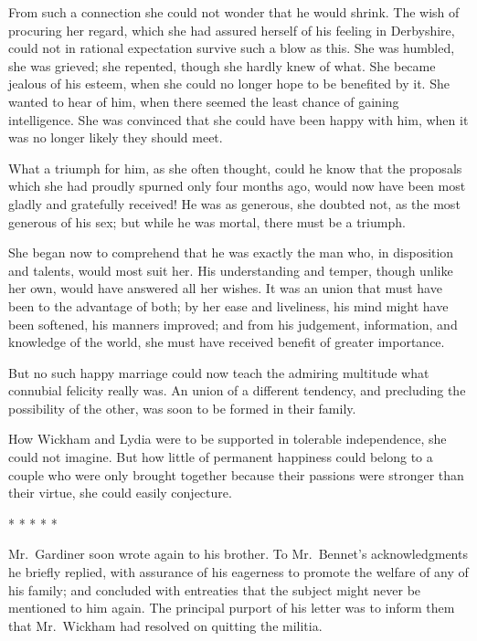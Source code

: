 From such a connection she could not wonder that he would shrink.
The wish of procuring her regard, which she had assured herself
of his feeling in Derbyshire, could not in rational expectation
survive such a blow as this.  She was humbled, she was grieved;
she repented, though she hardly knew of what.  She became jealous
of his esteem, when she could no longer hope to be benefited by it.
She wanted to hear of him, when there seemed the least chance of
gaining intelligence.  She was convinced that she could have been
happy with him, when it was no longer likely they should meet.

What a triumph for him, as she often thought, could he know
that the proposals which she had proudly spurned only four
months ago, would now have been most gladly and gratefully
received!  He was as generous, she doubted not, as the most
generous of his sex; but while he was mortal, there must be a
triumph.

She began now to comprehend that he was exactly the man
who, in disposition and talents, would most suit her.  His
understanding and temper, though unlike her own, would have
answered all her wishes.  It was an union that must have been
to the advantage of both; by her ease and liveliness, his mind
might have been softened, his manners improved; and from his
judgement, information, and knowledge of the world, she must
have received benefit of greater importance.

But no such happy marriage could now teach the admiring
multitude what connubial felicity really was.  An union of a
different tendency, and precluding the possibility of the
other, was soon to be formed in their family.

How Wickham and Lydia were to be supported in tolerable
independence, she could not imagine.  But how little of
permanent happiness could belong to a couple who were only
brought together because their passions were stronger than
their virtue, she could easily conjecture.

\begin{center}* * * * *\end{center}

Mr.\ Gardiner soon wrote again to his brother.  To Mr.\ Bennet's
acknowledgments he briefly replied, with assurance of his
eagerness to promote the welfare of any of his family; and
concluded with entreaties that the subject might never be
mentioned to him again.  The principal purport of his letter was
to inform them that Mr.\ Wickham had resolved on quitting the
militia.

